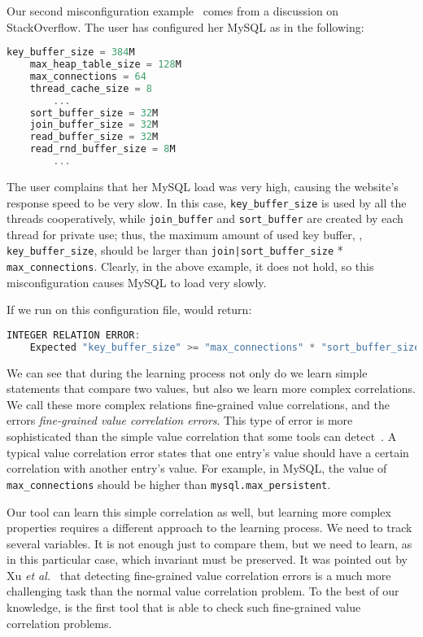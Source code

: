 \label{ex:fine}
Our second misconfiguration example~\cite{correlation} 
comes from a discussion on StackOverflow.
The user has configured her MySQL as in the following:

\begin{lstlisting}[language=C, xleftmargin=.01\textwidth]
    key_buffer_size = 384M
    max_heap_table_size = 128M
    max_connections = 64
    thread_cache_size = 8
        ...
    sort_buffer_size = 32M
    join_buffer_size = 32M
    read_buffer_size = 32M
    read_rnd_buffer_size = 8M
        ...
\end{lstlisting} 

The user complains that her MySQL load was very high, 
causing the website's
response speed to be very slow.
In this case, {\tt key\_buffer\_size} is used by all the threads
cooperatively, while {\tt join\_buffer} and {\tt sort\_buffer} are 
created by each thread for private use; thus, the maximum amount
of used key buffer, \ie, {\tt key\_buffer\_size}, should be larger than 
{\tt join|sort\_buffer\_size} * {\tt max\_connections}. 
Clearly, in the above example, it does not hold, 
so this misconfiguration causes MySQL to load very slowly.

If we run \app on this configuration file, \app  would return:

\begin{lstlisting}[language=C, xleftmargin=.01\textwidth]
    INTEGER RELATION ERROR:
    Expected "key_buffer_size" >= "max_connections" * "sort_buffer_size"
\end{lstlisting} 

We can see that during the learning process not only do we learn simple statements that compare two values, 
but also we learn more complex correlations. We call these more complex relations fine-grained value correlations, and the errors
\emph{fine-grained value correlation errors}. 
This type of error is more sophisticated than the simple value correlation that some tools can detect~\cite{yin11anempirical, zhang14encore}.
A typical value correlation error
states that one entry's value should have a certain correlation with
another entry's value. For example, in MySQL,
the value of {\tt max\_connections} should be higher than
{\tt mysql.max\_persistent}. 

Our tool can learn this simple correlation as well, but learning more complex properties requires a different 
approach to the learning 
process. We need to track several variables. It is not enough just to compare them, but we need to learn, as in this particular case, which
invariant must be preserved. It was pointed out by Xu {\em et al.}~\cite{xu15hey} that
detecting fine-grained value correlation errors 
is a much more challenging
task than the normal value correlation problem.
To the best of our knowledge, \app is the first tool that
is able to check such fine-grained value correlation problems.


